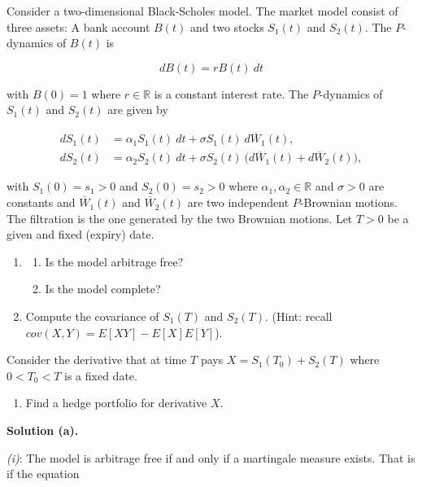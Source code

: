 \documentclass[
]{book}
\providecommand{\tightlist}{%
  \setlength{\itemsep}{0pt}\setlength{\parskip}{0pt}}
\begin{document}
Consider a two-dimensional Black-Scholes model. The market model consist of three assets: A bank account \(B(t)\) and two stocks \(S_1(t)\) and \(S_2(t)\). The \(P\)-dynamics of \(B(t)\) is

\[
dB(t)=rB(t)\ dt
\]

with \(B(0)=1\) where \(r\in\mathbb{R}\) is a constant interest rate. The \(P\)-dynamics of \(S_1(t)\) and \(S_2(t)\) are given by

\begin{align*}
dS_1(t)&=\alpha_1S_1(t)\ dt+\sigma S_1(t)\ d\overline{W}_1(t),\\
dS_2(t)&=\alpha_2S_2(t)\ dt+\sigma S_2(t)\ \big(d\overline{W}_1(t)+d\overline{W}_2(t)\big),
\end{align*}

with \(S_1(0)=s_1>0\) and \(S_2(0)=s_2>0\) where \(\alpha_1,\alpha_2\in\mathbb{R}\) and \(\sigma>0\) are constants and \(\overline{W}_1(t)\) and \(\overline{W}_2(t)\) are two independent \(P\)-Brownian motions. The filtration is the one generated by the two Brownian motions. Let \(T>0\) be a given and fixed (expiry) date.

\begin{enumerate}
\def\labelenumi{\alph{enumi}.}
\item
  \begin{enumerate}
  \def\labelenumii{\roman{enumii}.}
  \tightlist
  \item
    Is the model arbitrage free?
  \item
    Is the model complete?
  \end{enumerate}
\item
  Compute the covariance of \(S_1(T)\) and \(S_2(T)\). (Hint: recall \(cov(X,Y)=E[XY]-E[X]E[Y]\)).
\end{enumerate}

Consider the derivative that at time \(T\) pays \(X=S_1(T_0)+S_2(T)\) where \(0<T_0<T\) is a fixed date.

\begin{enumerate}
\def\labelenumi{\alph{enumi}.}
\setcounter{enumi}{2}
\tightlist
\item
  Find a hedge portfolio for derivative \(X\).
\end{enumerate}

\noindent\makebox[\linewidth]{\rule{\textwidth}{0.4pt}}

\textbf{Solution (a).}

\emph{(i)}: The model is arbitrage free if and only if a martingale measure exists. That is if the equation
\end{document}
